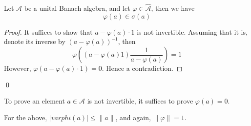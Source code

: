 \begin{proposition}
    Let $\mathcal{A}$ be a unital Banach algebra, and let $\varphi\in\widehat{\mathcal{A}}$, then we have
    \begin{equation*}
        \varphi(a)\in\sigma(a)
    \end{equation*}
\end{proposition}
\begin{proof}
    It suffices to show that $a-\varphi(a)\cdot 1$ is not invertible. Assuming that it is, denote its inverse by $(a-\varphi(a))^{-1}$, then
    \begin{equation*}
        \varphi\left((a-\varphi(a)1)\frac{1}{a-\varphi(a)}\right)=1
    \end{equation*}
    However, $\varphi(a-\varphi(a)\cdot 1)=0$. Hence a contradiction.
\end{proof}
\qed

\begin{remark}
    To prove an element $a\in\mathcal{A}$ is not invertible, it suffices to prove $\varphi(a)=0$.
\end{remark}

\begin{corollary}
    For the above, $|varphi(a)|\leq\|a\|$, and again, $\|\varphi\|=1$.
\end{corollary}




